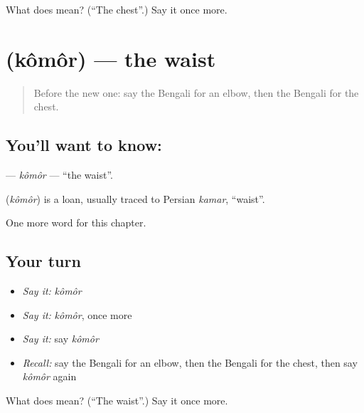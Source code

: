 \begin{tcolorbox}[breakable,colback=teal!4,colframe=teal!35!black,title={Before you move on}]
What does  mean? (\textquotedblleft{}The chest\textquotedblright{}.) Say it once more.
\end{tcolorbox}
\section[\texorpdfstring{\bn{কোমর} (kômôr)}{কোমর (kômôr)}]{ (kômôr) — the waist}

\label{lesson:BN-C123-komor}



\begin{quote}
Before the new one: say the Bengali for an elbow, then the Bengali for the chest.
\end{quote}

\subsection*{You'll want to know: }
\textbf{} — \emph{kômôr} — \textquotedblleft{}the waist\textquotedblright{}.

\begin{cousinweb}
\textbf{} (\emph{kômôr}) is a loan, usually traced to Persian \emph{kamar}, \textquotedblleft{}waist\textquotedblright{}.
\end{cousinweb}

\begin{grammarlens}[title={What you've built}]
One more word for this chapter.
\end{grammarlens}

\subsection*{Your turn}
\begin{itemize}
\raggedright
  \item \emph{Say it:} \emph{kômôr}
  \item \emph{Say it:} \emph{kômôr}, once more
  \item \emph{Say it:} say \emph{kômôr}
  \item \emph{Recall:} say the Bengali for an elbow, then the Bengali for the chest, then say \emph{kômôr} again
\end{itemize}

\begin{tcolorbox}[breakable,colback=teal!4,colframe=teal!35!black,title={Before you move on}]
What does  mean? (\textquotedblleft{}The waist\textquotedblright{}.) Say it once more.
\end{tcolorbox}
